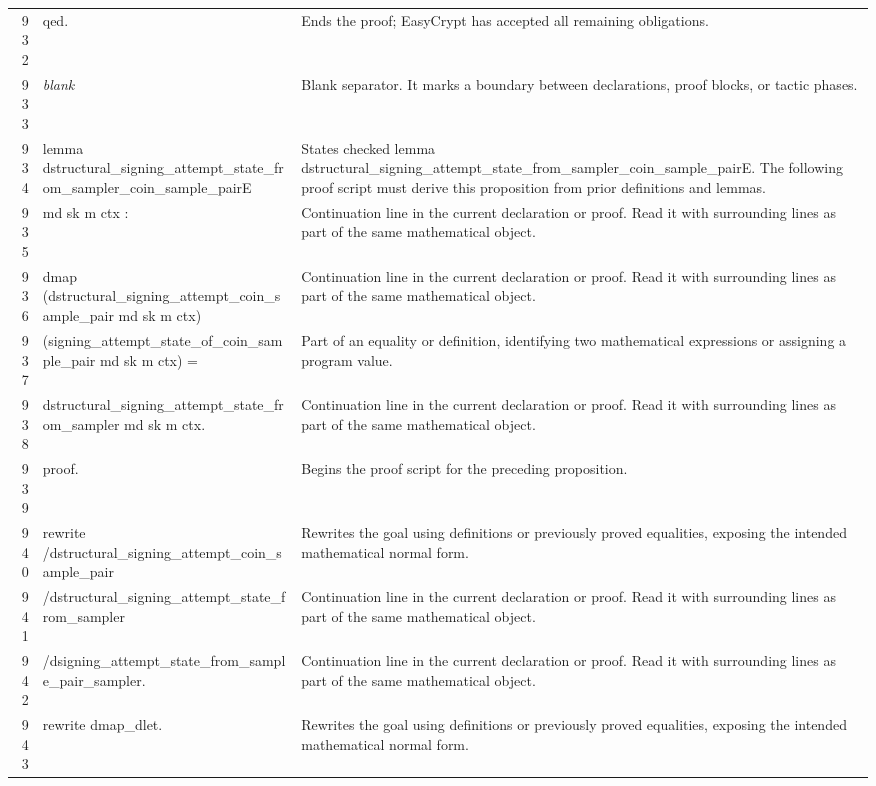 \documentclass[10pt]{article}
\begin{document}
\begin{longtable}{r L{0.53\textwidth} L{0.37\textwidth}}
932 & {\ttfamily\scriptsize qed.} & Ends the proof; EasyCrypt has accepted all remaining obligations. \\
933 & {\ttfamily\scriptsize \emph{blank}} & Blank separator.  It marks a boundary between declarations, proof blocks, or tactic phases. \\
934 & {\ttfamily\scriptsize lemma dstructural\_signing\_attempt\_state\_from\_sampler\_coin\_sample\_pairE} & States checked lemma dstructural\_signing\_attempt\_state\_from\_sampler\_coin\_sample\_pairE.  The following proof script must derive this proposition from prior definitions and lemmas. \\
935 & {\ttfamily\scriptsize    md sk m ctx :} & Continuation line in the current declaration or proof.  Read it with surrounding lines as part of the same mathematical object. \\
936 & {\ttfamily\scriptsize   dmap (dstructural\_signing\_attempt\_coin\_sample\_pair md sk m ctx)} & Continuation line in the current declaration or proof.  Read it with surrounding lines as part of the same mathematical object. \\
937 & {\ttfamily\scriptsize     (signing\_attempt\_state\_of\_coin\_sample\_pair md sk m ctx) =} & Part of an equality or definition, identifying two mathematical expressions or assigning a program value. \\
938 & {\ttfamily\scriptsize   dstructural\_signing\_attempt\_state\_from\_sampler md sk m ctx.} & Continuation line in the current declaration or proof.  Read it with surrounding lines as part of the same mathematical object. \\
939 & {\ttfamily\scriptsize proof.} & Begins the proof script for the preceding proposition. \\
940 & {\ttfamily\scriptsize rewrite /dstructural\_signing\_attempt\_coin\_sample\_pair} & Rewrites the goal using definitions or previously proved equalities, exposing the intended mathematical normal form. \\
941 & {\ttfamily\scriptsize         /dstructural\_signing\_attempt\_state\_from\_sampler} & Continuation line in the current declaration or proof.  Read it with surrounding lines as part of the same mathematical object. \\
942 & {\ttfamily\scriptsize         /dsigning\_attempt\_state\_from\_sample\_pair\_sampler.} & Continuation line in the current declaration or proof.  Read it with surrounding lines as part of the same mathematical object. \\
943 & {\ttfamily\scriptsize rewrite dmap\_dlet.} & Rewrites the goal using definitions or previously proved equalities, exposing the intended mathematical normal form. \\

\end{longtable}
\end{document}
